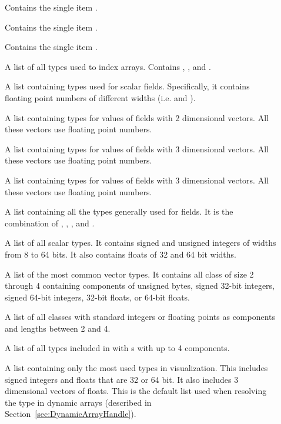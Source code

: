 \begin{description}
\item[] Contains the single item .
\item[] Contains the single item .
\item[] Contains the single item .
\item[] A list of all types used to index
  arrays. Contains , , and .
\item[] A list containing types used for
  scalar fields. Specifically, it contains floating point numbers of
  different widths (i.e.  and ).
\item[] A list containing types for values of
  fields with 2 dimensional vectors. All these vectors use floating point
  numbers.
\item[] A list containing types for values of
  fields with 3 dimensional vectors. All these vectors use floating point
  numbers.
\item[] A list containing types for values of
  fields with 3 dimensional vectors. All these vectors use floating point
  numbers.
\item[] A list containing all the types generally
  used for fields. It is the combination of ,
  , , and
  .
\item[] A list of all scalar types. It contains
  signed and unsigned integers of widths from 8 to 64 bits. It also
  contains floats of 32 and 64 bit widths.
\item[] A list of the most common vector
  types. It contains all  class of size 2 through 4 containing
  components of unsigned bytes, signed 32-bit integers, signed 64-bit
  integers, 32-bit floats, or 64-bit floats.
\item[] A list of all  classes with
  standard integers or floating points as components and lengths between 2
  and 4.
\item[] A list of all types included in
   with s with up to 4 components.
\item[] A list containing only the most used types
  in visualization. This includes signed integers and floats that are 32 or
  64 bit. It also includes 3 dimensional vectors of floats. This is the
  default list used when resolving the type in dynamic arrays (described in
  Section~\ref{sec:DynamicArrayHandle}).
\end{description}

